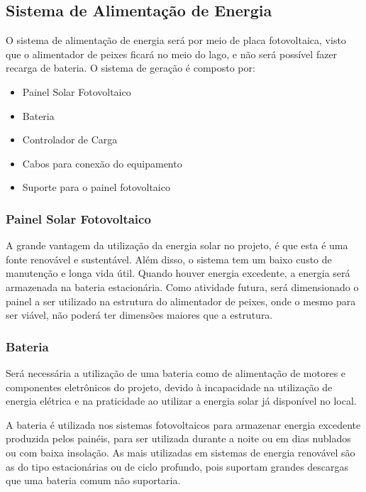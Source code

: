 \subsection{Sistema de Alimentação de Energia}
O sistema de alimentação de energia será por meio de placa fotovoltaica, visto que o alimentador de peixes ficará no meio do lago, e não será possível fazer recarga de bateria. O sistema de geração é composto por:

\begin{itemize}
    \item Painel Solar Fotovoltaico
    \item Bateria
    \item Controlador de Carga
    \item Cabos para conexão do equipamento
    \item Suporte para o painel fotovoltaico

\end{itemize}

\subsubsection{Painel Solar Fotovoltaico}
A grande vantagem da utilização da energia solar no projeto, é que esta é uma fonte renovável e sustentável. Além disso, o sistema tem um baixo custo de manutenção e longa vida útil. Quando houver energia excedente, a energia será armazenada na bateria estacionária.
Como atividade futura, será dimensionado o painel a ser utilizado na estrutura do alimentador de peixes, onde o mesmo para ser viável, não poderá ter dimensões maiores que a estrutura.

\subsubsection{Bateria}

Será necessária a utilização de uma bateria como de alimentação de motores e componentes eletrônicos do projeto, devido à incapacidade na utilização de energia elétrica e na praticidade ao utilizar a energia solar já disponível no local.

A bateria é utilizada nos sistemas fotovoltaicos para armazenar energia excedente produzida pelos painéis, para ser utilizada durante a noite ou em dias nublados ou com baixa insolação. As mais utilizadas em sistemas de energia renovável são as do tipo estacionárias ou de ciclo profundo, pois suportam grandes descargas que uma bateria comum não suportaria.

